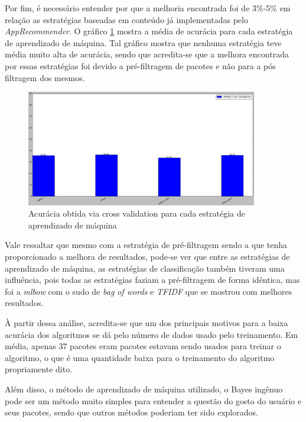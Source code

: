 Por fim, é necessário entender por que a melhoria encontrada foi de 3\%-5\% em
relação as estratégias baseadas em conteúdo já implementadas pelo
\textit{AppRecommender}. O gráfico \ref{fig:segundo_experimento_cross_validation}
mostra a média de acurácia para cada estratégia de aprendizado de máquina. Tal
gráfico mostra que nenhuma estratégia teve média muito alta de acurácia, sendo
que acredita-se que a melhora encontrada por essas estratégias foi devido a
pré-filtragem de pacotes e não para a pós filtragem dos mesmos.

\begin{figure}[h]
  \centering
  \includegraphics[width=0.9\textwidth]{figuras/segundo_experimento_cross_validation.eps}
  \caption{Acurácia obtida via cross validation para cada estratégia de aprendizado de máquina}
  \label{fig:segundo_experimento_cross_validation}
\end{figure}

Vale ressaltar que mesmo com a estratégia de pré-filtragem sendo a que tenha
proporcionado a melhora de resultados, pode-se ver que entre as estratégias de
aprendizado de máquina, as estratégias de classificação também tiveram uma
influência, pois todas as estratégias faziam a pré-filtragem de forma idêntica,
mas foi a \textit{mlbow} com o sudo de \textit{bag of words} e \textit{TFIDF} que
se mostrou com melhores resultados.

À partir dessa análise, acredita-se que um dos principais motivos para a baixa acurácia dos algoritmos
se dá pelo número de dados usado pelo treinamento. Em média, apenas 37 pacotes
eram pacotes estavam sendo usados para treinar o algoritmo, o que é uma
quantidade baixa para o treinamento do algoritmo propriamente dito.

Além disso, o método de aprendizado de máquina utilizado, o Bayes ingênuo pode
ser um método muito simples para entender a questão do gosto do usuário e seus
pacotes, sendo que outros métodos poderiam ter sido explorados.

